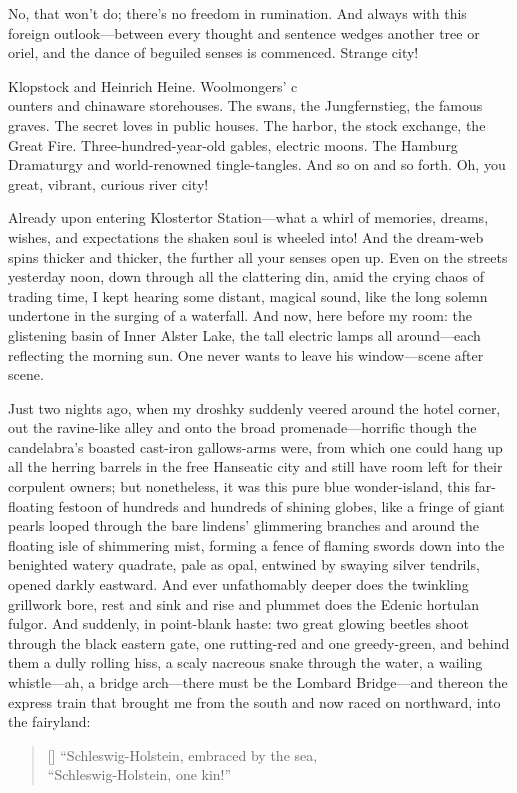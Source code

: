 \documentclass[12pt,a4paper]{article}
\begin{document}
No, that won’t do; there’s no freedom in rumination. And always with this foreign outlook—between every thought and sentence wedges another tree or oriel, and the dance of beguiled senses is commenced. Strange city!

Klopstock and Heinrich Heine. Woolmongers’ c\\ounters and chinaware storehouses. The swans, the Jungfernstieg, the famous graves. The secret loves in public houses. The harbor, the stock exchange, the Great Fire. Three-hundred-year-old gables, electric moons. The Hamburg Dramaturgy and world-renowned tingle-tangles. And so on and so forth. Oh, you great, vibrant, curious river city!

Already upon entering Klostertor Station—what a whirl of memories, dreams, wishes, and expectations the shaken soul is wheeled into! And the dream-web spins thicker and thicker, the further all your senses open up. Even on the streets yesterday noon, down through all the clattering din, amid the crying chaos of trading time, I kept hearing some distant, magical sound, like the long solemn undertone in the surging of a waterfall. And now, here before my room: the glistening basin of Inner Alster Lake, the tall electric lamps all around—each reflecting the morning sun. One never wants to leave his window—scene after scene.

Just two nights ago, when my droshky suddenly veered around the hotel corner, out the ravine-like alley and onto the broad promenade—horrific though the candelabra’s boasted cast-iron gallows-arms were, from which one could hang up all the herring barrels in the free Hanseatic city and still have room left for their corpulent owners; but nonetheless, it was this pure blue wonder-island, this far-floating festoon of hundreds and hundreds of shining globes, like a fringe of giant pearls looped through the bare lindens’ glimmering branches and around the floating isle of shimmering mist, forming a fence of flaming swords down into the benighted watery quadrate, pale as opal, entwined by swaying silver tendrils, opened darkly eastward. And ever unfathomably deeper does the twinkling grillwork bore, rest and sink and rise and plummet does the Edenic hortulan fulgor. And suddenly, in point-blank haste: two great glowing beetles shoot through the black eastern gate, one rutting-red and one greedy-green, and behind them a dully rolling hiss, a scaly nacreous snake through the water, a wailing whistle—ah, a bridge arch—there must be the Lombard Bridge—and thereon the express train that brought me from the south and now raced on northward, into the fairyland:
\settowidth{\versewidth}{“Schleswig-Holstein, embraced by the sea,}
\begin{verse}[\versewidth]
“Schleswig-Holstein, embraced by the sea, \\
“Schleswig-Holstein, one kin!”
\end{verse}
\end{document}
